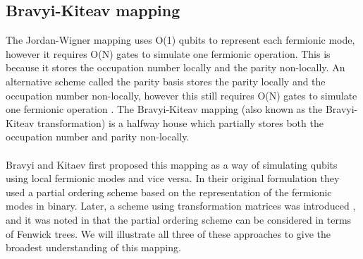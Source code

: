 \documentclass[twoside]{article}
\begin{document}
\subsection{Bravyi-Kiteav mapping}\label{bravyi-kitaev_section}
The Jordan-Wigner mapping uses O(1) qubits to represent each fermionic mode, however it requires O(N) gates to simulate one fermionic operation. This is because it stores the occupation number locally and the parity non-locally. An alternative scheme called the parity basis stores the parity locally and the occupation number non-locally, however this still requires O(N) gates to simulate one fermionic operation \cite{seeley}. The Bravyi-Kiteav mapping (also known as the Bravyi-Kiteav transformation) is a halfway house which partially stores both the occupation number and parity non-locally.
\\\\
Bravyi and Kitaev first proposed this mapping as a way of simulating qubits using local fermionic modes and vice versa. In their original formulation they used a partial ordering scheme based on the representation of the fermionic modes in binary. Later, a scheme using transformation matrices was introduced \cite{seeley}, and it was noted in \cite{operatorLocality} that the partial ordering scheme can be considered in terms of Fenwick trees. We will illustrate all three of these approaches to give the broadest understanding of this mapping. 
\end{document}
